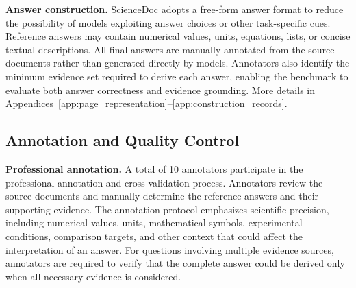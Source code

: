 \documentclass{article} %
\begin{document}

\textbf{Answer construction.} ScienceDoc adopts a free-form answer format to reduce the possibility of models exploiting answer choices or other task-specific cues. Reference answers may contain numerical values, units, equations, lists, or concise textual descriptions. All final answers are manually annotated from the source documents rather than generated directly by models. Annotators also identify the minimum evidence set required to derive each answer, enabling the benchmark to evaluate both answer correctness and evidence grounding. More details in Appendices~\ref{app:page_representation}--\ref{app:construction_records}.

\subsection{Annotation and Quality Control}

\textbf{Professional annotation.} A total of 10 annotators participate in the professional annotation and cross-validation process. Annotators review the source documents and manually determine the reference answers and their supporting evidence. The annotation protocol emphasizes scientific precision, including numerical values, units, mathematical symbols, experimental conditions, comparison targets, and other context that could affect the interpretation of an answer. For questions involving multiple evidence sources, annotators are required to verify that the complete answer could be derived only when all necessary evidence is considered.
\end{document}
